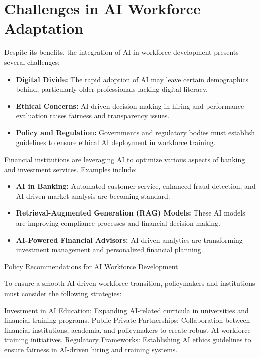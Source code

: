 \documentclass[a4paper,headinclude=on,footinclude=on,12pt,oneside]{scrbook}
\begin{document}
\section{Challenges in AI Workforce Adaptation}

Despite its benefits, the integration of AI in workforce development presents several challenges:
\begin{itemize}
	\item \textbf{Digital Divide:} The rapid adoption of AI may leave certain demographics behind, particularly older professionals lacking digital literacy.
	\item \textbf{Ethical Concerns:} AI-driven decision-making in hiring and performance evaluation raises fairness and transparency issues.
	\item \textbf{Policy and Regulation:} Governments and regulatory bodies must establish guidelines to ensure ethical AI deployment in workforce training.
\end{itemize}


Financial institutions are leveraging AI to optimize various aspects of banking and investment services. Examples include:
\begin{itemize}
	\item \textbf{AI in Banking:} Automated customer service, enhanced fraud detection, and AI-driven market analysis are becoming standard.
	\item \textbf{Retrieval-Augmented Generation (RAG) Models:} These AI models are improving compliance processes and financial decision-making.
	\item \textbf{AI-Powered Financial Advisors:} AI-driven analytics are transforming investment management and personalized financial planning.
\end{itemize}

Policy Recommendations for AI Workforce Development

To ensure a smooth AI-driven workforce transition, policymakers and institutions must consider the following strategies:

Investment in AI Education: Expanding AI-related curricula in universities and financial training programs.
Public-Private Partnerships: Collaboration between financial institutions, academia, and policymakers to create robust AI workforce training initiatives.
Regulatory Frameworks: Establishing AI ethics guidelines to ensure fairness in AI-driven hiring and training systems.
\end{document}
